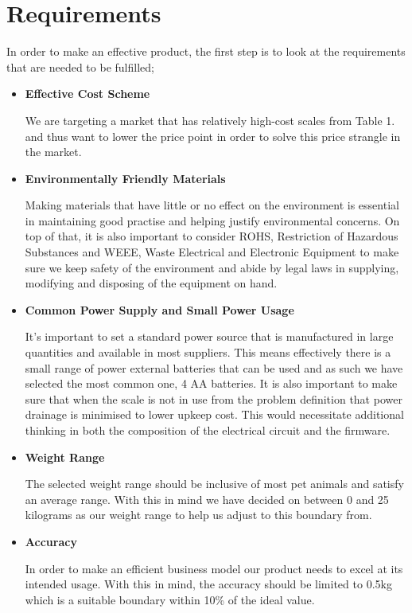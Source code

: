 \section{Requirements}
In order to make an effective product, the first step is to look at the requirements that are needed to be fulfilled;
\begin{itemize}
\item \textbf{Effective Cost Scheme}

We are targeting a market that has relatively high-cost scales from Table 1. and thus want to lower the price point in order to solve this price strangle in the market.

\item \textbf{Environmentally Friendly Materials}

Making materials that have little or no effect on the environment is essential in maintaining good practise and helping justify environmental concerns. On top of that, it is also important to consider ROHS, Restriction of Hazardous Substances and WEEE, Waste Electrical and Electronic Equipment to make sure we keep safety of the environment and abide by legal laws in supplying, modifying and disposing of the equipment on hand.

\item \textbf{Common Power Supply and Small Power Usage}

It's important to set a standard power source that is manufactured in large quantities and available in most suppliers. This means effectively there is a small range of power external batteries that can be used and as such we have selected the most common one, 4 AA batteries. It is also important to make sure that when the scale is not in use from the problem definition that power drainage is minimised to lower upkeep cost. This would necessitate additional thinking in both the composition of the electrical circuit and the firmware.

\item \textbf{Weight Range}

The selected weight range should be inclusive of most pet animals and satisfy an average range. With this in mind we have decided on between 0 and 25 kilograms as our weight range to help us adjust to this boundary from.

\item \textbf{Accuracy}

In order to make an efficient business model our product needs to excel at its intended usage. With this in mind, the accuracy should be limited to 0.5kg which is a suitable boundary within 10\% of the ideal value.


\end{itemize}
